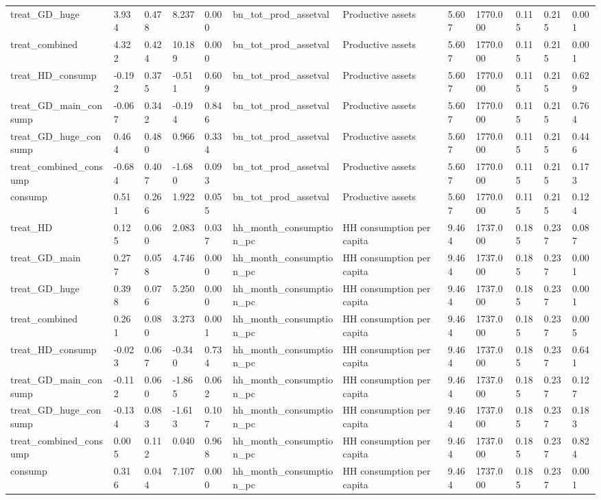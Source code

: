 \begin{tabular}{llllllllllll}
treat\_GD\_huge & 3.934 & 0.478 & 8.237 & 0.000 & bn\_tot\_prod\_assetval & Productive assets & 5.607 & 1770.000 & 0.115 & 0.215 & 0.001 \\
treat\_combined & 4.322 & 0.424 & 10.189 & 0.000 & bn\_tot\_prod\_assetval & Productive assets & 5.607 & 1770.000 & 0.115 & 0.215 & 0.001 \\
treat\_HD\_consump & -0.192 & 0.375 & -0.511 & 0.609 & bn\_tot\_prod\_assetval & Productive assets & 5.607 & 1770.000 & 0.115 & 0.215 & 0.629 \\
treat\_GD\_main\_consump & -0.067 & 0.342 & -0.194 & 0.846 & bn\_tot\_prod\_assetval & Productive assets & 5.607 & 1770.000 & 0.115 & 0.215 & 0.764 \\
treat\_GD\_huge\_consump & 0.464 & 0.480 & 0.966 & 0.334 & bn\_tot\_prod\_assetval & Productive assets & 5.607 & 1770.000 & 0.115 & 0.215 & 0.446 \\
treat\_combined\_consump & -0.684 & 0.407 & -1.680 & 0.093 & bn\_tot\_prod\_assetval & Productive assets & 5.607 & 1770.000 & 0.115 & 0.215 & 0.173 \\
consump & 0.511 & 0.266 & 1.922 & 0.055 & bn\_tot\_prod\_assetval & Productive assets & 5.607 & 1770.000 & 0.115 & 0.215 & 0.124 \\
treat\_HD & 0.125 & 0.060 & 2.083 & 0.037 & hh\_month\_consumption\_pc & HH consumption per capita & 9.464 & 1737.000 & 0.185 & 0.237 & 0.087 \\
treat\_GD\_main & 0.277 & 0.058 & 4.746 & 0.000 & hh\_month\_consumption\_pc & HH consumption per capita & 9.464 & 1737.000 & 0.185 & 0.237 & 0.001 \\
treat\_GD\_huge & 0.398 & 0.076 & 5.250 & 0.000 & hh\_month\_consumption\_pc & HH consumption per capita & 9.464 & 1737.000 & 0.185 & 0.237 & 0.001 \\
treat\_combined & 0.261 & 0.080 & 3.273 & 0.001 & hh\_month\_consumption\_pc & HH consumption per capita & 9.464 & 1737.000 & 0.185 & 0.237 & 0.005 \\
treat\_HD\_consump & -0.023 & 0.067 & -0.340 & 0.734 & hh\_month\_consumption\_pc & HH consumption per capita & 9.464 & 1737.000 & 0.185 & 0.237 & 0.641 \\
treat\_GD\_main\_consump & -0.112 & 0.060 & -1.865 & 0.062 & hh\_month\_consumption\_pc & HH consumption per capita & 9.464 & 1737.000 & 0.185 & 0.237 & 0.127 \\
treat\_GD\_huge\_consump & -0.134 & 0.083 & -1.613 & 0.107 & hh\_month\_consumption\_pc & HH consumption per capita & 9.464 & 1737.000 & 0.185 & 0.237 & 0.183 \\
treat\_combined\_consump & 0.005 & 0.112 & 0.040 & 0.968 & hh\_month\_consumption\_pc & HH consumption per capita & 9.464 & 1737.000 & 0.185 & 0.237 & 0.824 \\
consump & 0.316 & 0.044 & 7.107 & 0.000 & hh\_month\_consumption\_pc & HH consumption per capita & 9.464 & 1737.000 & 0.185 & 0.237 & 0.001 \\
\bottomrule
\end{tabular}
